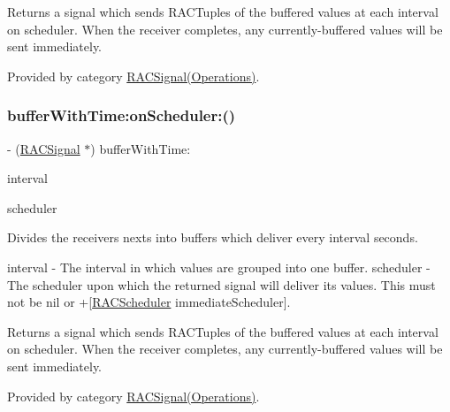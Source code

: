 Returns a signal which sends R\+A\+C\+Tuples of the buffered values at each interval on {\ttfamily scheduler}. When the receiver completes, any currently-\/buffered values will be sent immediately. 

Provided by category \mbox{\hyperlink{category_r_a_c_signal_07_operations_08_a7f0cb2086a2123f40552d2eab2a9cc54}{R\+A\+C\+Signal(\+Operations)}}.

\mbox{\label{interface_r_a_c_signal_a7f0cb2086a2123f40552d2eab2a9cc54}} 
\subsubsection{\texorpdfstring{buffer\+With\+Time\+:on\+Scheduler\+:()}{bufferWithTime:onScheduler:()}\hspace{0.1cm}{\footnotesize\ttfamily [3/3]}}
{\footnotesize\ttfamily -\/ (\mbox{\hyperlink{interface_r_a_c_signal}{R\+A\+C\+Signal}} $\ast$) buffer\+With\+Time\+: \begin{DoxyParamCaption}\item[{(N\+S\+Time\+Interval)}]{interval }\item[{onScheduler:(\mbox{\hyperlink{interface_r_a_c_scheduler}{R\+A\+C\+Scheduler}} $\ast$)}]{scheduler }\end{DoxyParamCaption}}

Divides the receiver\textquotesingle{}s {\ttfamily next}s into buffers which deliver every {\ttfamily interval} seconds.

interval -\/ The interval in which values are grouped into one buffer. scheduler -\/ The scheduler upon which the returned signal will deliver its values. This must not be nil or +\mbox{[}\mbox{\hyperlink{interface_r_a_c_scheduler}{R\+A\+C\+Scheduler}} immediate\+Scheduler\mbox{]}.

Returns a signal which sends R\+A\+C\+Tuples of the buffered values at each interval on {\ttfamily scheduler}. When the receiver completes, any currently-\/buffered values will be sent immediately. 

Provided by category \mbox{\hyperlink{category_r_a_c_signal_07_operations_08_a7f0cb2086a2123f40552d2eab2a9cc54}{R\+A\+C\+Signal(\+Operations)}}.

